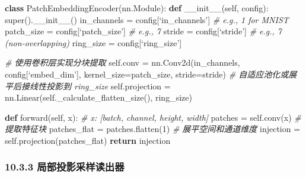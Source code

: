 \documentclass[
  12pt,
]{article}
\newenvironment{Shaded}{}{}
\newcommand{\BuiltInTok}[1]{#1}
\newcommand{\CommentTok}[1]{\textcolor[rgb]{0.38,0.63,0.69}{\textit{#1}}}
\newcommand{\ControlFlowTok}[1]{\textcolor[rgb]{0.00,0.44,0.13}{\textbf{#1}}}
\newcommand{\DecValTok}[1]{\textcolor[rgb]{0.25,0.63,0.44}{#1}}
\newcommand{\FunctionTok}[1]{\textcolor[rgb]{0.02,0.16,0.49}{#1}}
\newcommand{\KeywordTok}[1]{\textcolor[rgb]{0.00,0.44,0.13}{\textbf{#1}}}
\newcommand{\NormalTok}[1]{#1}
\newcommand{\OperatorTok}[1]{\textcolor[rgb]{0.40,0.40,0.40}{#1}}
\newcommand{\VariableTok}[1]{\textcolor[rgb]{0.10,0.09,0.49}{#1}}
\begin{document}
\begin{Shaded}
\begin{Highlighting}[]
\KeywordTok{class}\NormalTok{ PatchEmbeddingEncoder(nn.Module):}
    \KeywordTok{def} \FunctionTok{\_\_init\_\_}\NormalTok{(}\VariableTok{self}\NormalTok{, config):}
        \BuiltInTok{super}\NormalTok{().}\FunctionTok{\_\_init\_\_}\NormalTok{()}
\NormalTok{        in\_channels }\OperatorTok{=}\NormalTok{ config[‘in\_channels’]  }\CommentTok{\# e.g., 1 for MNIST}
\NormalTok{        patch\_size }\OperatorTok{=}\NormalTok{ config[‘patch\_size’]    }\CommentTok{\# e.g., 7}
\NormalTok{        stride }\OperatorTok{=}\NormalTok{ config[‘stride’]            }\CommentTok{\# e.g., 7 (non{-}overlapping)}
\NormalTok{        ring\_size }\OperatorTok{=}\NormalTok{ config[‘ring\_size’]}
        
        \CommentTok{\# 使用卷积层实现分块提取}
        \VariableTok{self}\NormalTok{.conv }\OperatorTok{=}\NormalTok{ nn.Conv2d(in\_channels, }
\NormalTok{                              config[‘embed\_dim’], }
\NormalTok{                              kernel\_size}\OperatorTok{=}\NormalTok{patch\_size, }
\NormalTok{                              stride}\OperatorTok{=}\NormalTok{stride)}
        \CommentTok{\# 自适应池化或展平后接线性投影到 ring\_size}
        \VariableTok{self}\NormalTok{.projection }\OperatorTok{=}\NormalTok{ nn.Linear(}\VariableTok{self}\NormalTok{.\_calculate\_flatten\_size(), ring\_size)}
        
    \KeywordTok{def}\NormalTok{ forward(}\VariableTok{self}\NormalTok{, x):}
        \CommentTok{\# x: [batch, channel, height, width]}
\NormalTok{        patches }\OperatorTok{=} \VariableTok{self}\NormalTok{.conv(x)               }\CommentTok{\# 提取特征块}
\NormalTok{        patches\_flat }\OperatorTok{=}\NormalTok{ patches.flatten(}\DecValTok{1}\NormalTok{)    }\CommentTok{\# 展平空间和通道维度}
\NormalTok{        injection }\OperatorTok{=} \VariableTok{self}\NormalTok{.projection(patches\_flat)}
        \ControlFlowTok{return}\NormalTok{ injection}
\end{Highlighting}
\end{Shaded}

\hypertarget{ux5c40ux90e8ux6295ux5f71ux91c7ux6837ux8bfbux51faux5668}{%
\subsubsection{10.3.3
局部投影采样读出器}\label{ux5c40ux90e8ux6295ux5f71ux91c7ux6837ux8bfbux51faux5668}}
\end{document}
